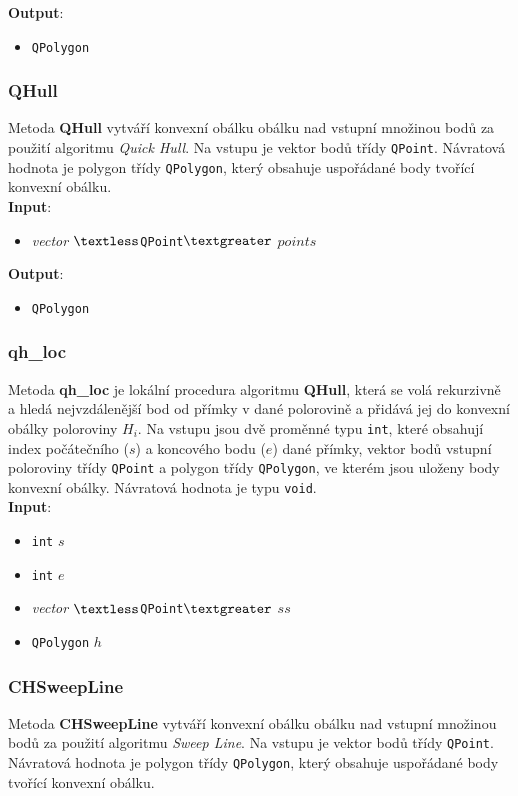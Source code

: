 \documentclass[a4paper, 12pt]{article}
\begin{document}
\textbf{Output}:
\begin{itemize}
\item \texttt{QPolygon}
\end{itemize}

\subsubsection{QHull}
Metoda \textbf{QHull} vytváří konvexní obálku obálku nad vstupní množinou bodů za použití algoritmu \textit{Quick Hull}. Na vstupu je vektor bodů třídy \texttt{QPoint}. Návratová hodnota je polygon třídy \texttt{QPolygon}, který obsahuje uspořádané body tvořící konvexní obálku.\\

\textbf{Input}:
\begin{itemize}
\item \textsl{vector} $\textless$\texttt{QPoint}$\textgreater$ $points$
\end{itemize}

\textbf{Output}:
\begin{itemize}
\item \texttt{QPolygon}
\end{itemize}

\subsubsection{qh\_loc}
Metoda \textbf{qh\_loc} je lokální procedura algoritmu \textbf{QHull}, která se volá rekurzivně a hledá nejvzdálenější bod od přímky v dané polorovině a přidává jej do konvexní obálky poloroviny $H_i$. Na vstupu jsou dvě proměnné typu \texttt{int}, které obsahují index počátečního ($s$) a koncového bodu ($e$) dané přímky, vektor bodů vstupní poloroviny třídy \texttt{QPoint} a polygon třídy \texttt{QPolygon}, ve kterém jsou uloženy body konvexní obálky. Návratová hodnota je typu \texttt{void}.\\

\textbf{Input}:
\begin{itemize}
\item \texttt{int} $s$
\item \texttt{int} $e$
\item \textsl{vector} $\textless$\texttt{QPoint}$\textgreater$ $ss$
\item \texttt{QPolygon} $h$
\end{itemize}

\subsubsection{CHSweepLine}
Metoda \textbf{CHSweepLine} vytváří konvexní obálku obálku nad vstupní množinou bodů za použití algoritmu \textit{Sweep Line}. Na vstupu je vektor bodů třídy \texttt{QPoint}. Návratová hodnota je polygon třídy \texttt{QPolygon}, který obsahuje uspořádané body tvořící konvexní obálku.\\
\end{document}
